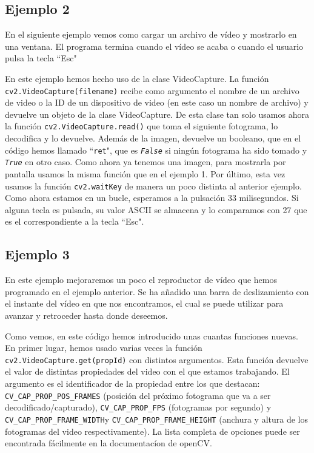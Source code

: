 \documentclass[a4paper,openright, 12pt]{book}
\begin{document}
\subsection*{Ejemplo 2}
En el siguiente ejemplo vemos como cargar un archivo de vídeo y mostrarlo en una ventana. El programa termina cuando el vídeo se acaba o cuando el usuario pulsa la tecla ``Esc"

En este ejemplo hemos hecho uso de la clase VideoCapture.
La función \lstinline|cv2.VideoCapture(filename)| recibe como argumento el nombre de un archivo de video o la ID de un dispositivo de video (en este caso un nombre de archivo) y devuelve un objeto de la clase VideoCapture.
De esta clase tan solo usamos ahora la función \lstinline|cv2.VideoCapture.read()| que toma el siguiente fotograma, lo decodifica y lo devuelve. Además de la imagen, devuelve un booleano, que en el código hemos llamado ``\lstinline|ret|", que es \textit{\lstinline|False|} si ningún fotograma ha sido tomado y \textit{\lstinline|True|} en otro caso.
Como ahora ya tenemos una imagen, para mostrarla por pantalla usamos la misma función que en el ejemplo 1.
Por último, esta vez usamos la función \lstinline|cv2.waitKey| de manera un poco distinta al anterior ejemplo. Como ahora estamos en un bucle, esperamos a la pulsación 33 milisegundos. Si alguna tecla es pulsada, su valor ASCII se almacena y lo comparamos con 27 que es el correspondiente a la tecla ``Esc".

\newpage
\subsection*{Ejemplo 3}
En este ejemplo mejoraremos un poco el reproductor de vídeo que hemos programado en el ejemplo anterior. Se ha añadido una barra de deslizamiento con el instante del vídeo en que nos encontramos, el cual se puede utilizar para avanzar y retroceder hasta donde deseemos.

Como vemos, en este código hemos introducido unas cuantas funciones nuevas.
En primer lugar, hemos usado varias veces la función \lstinline|cv2.VideoCapture.get(propId)| con distintos argumentos.
Esta función devuelve el valor de distintas propiedades del video con el que estamos trabajando. El argumento es el identificador de la propiedad entre los que destacan: \lstinline|CV_CAP_PROP_POS_FRAMES| (posición del próximo fotograma que va a ser decodificado/capturado), \lstinline|CV_CAP_PROP_FPS| (fotogramas por segundo) y \lstinline|CV_CAP_PROP_FRAME_WIDTH|y \lstinline|CV_CAP_PROP_FRAME_HEIGHT| (anchura y altura de los fotogramas del video respectivamente).
La lista completa de opciones puede ser encontrada fácilmente en la documentacíon de openCV.
\end{document}
